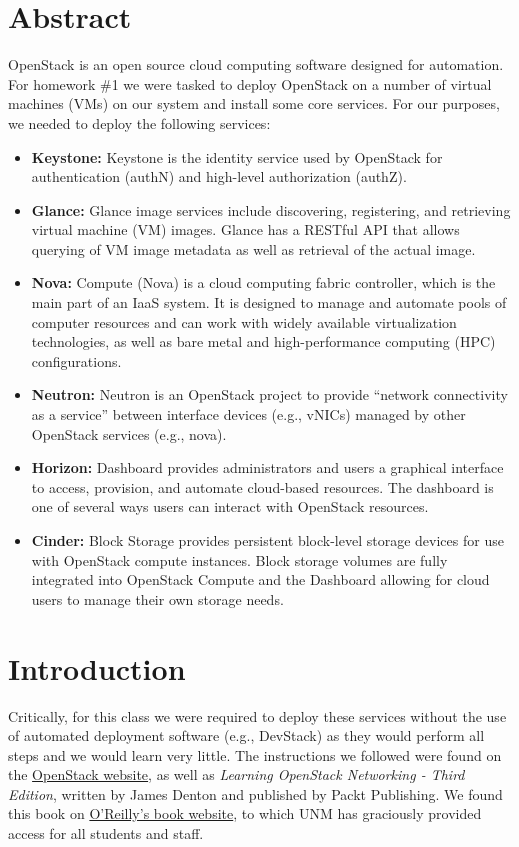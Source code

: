 \documentclass{article}
\begin{document}
\section{Abstract}
OpenStack is an open source cloud computing software designed for automation. For homework \#1 we were tasked to deploy OpenStack on a number of virtual machines (VMs) on our system and install some core services. For our purposes, we needed to deploy the following services:

\begin{itemize}
    \item \textbf{Keystone:} Keystone is the identity service used by OpenStack for authentication (authN) and high-level authorization (authZ).
    \item \textbf{Glance:} Glance image services include discovering, registering, and retrieving virtual machine (VM) images. Glance has a RESTful API that allows querying of VM image metadata as well as retrieval of the actual image.
    \item \textbf{Nova:} Compute (Nova) is a cloud computing fabric controller, which is the main part of an IaaS system. It is designed to manage and automate pools of computer resources and can work with widely available virtualization technologies, as well as bare metal and high-performance computing (HPC) configurations.
    \item \textbf{Neutron:} Neutron is an OpenStack project to provide “network connectivity as a service” between interface devices (e.g., vNICs) managed by other OpenStack services (e.g., nova).
    \item \textbf{Horizon:} Dashboard provides administrators and users a graphical interface to access, provision, and automate cloud-based resources. The dashboard is one of several ways users can interact with OpenStack resources.
    \item \textbf{Cinder:} Block Storage provides persistent block-level storage devices for use with OpenStack compute instances. Block storage volumes are fully integrated into OpenStack Compute and the Dashboard allowing for cloud users to manage their own storage needs.
\end{itemize}

\section{Introduction}
Critically, for this class we were required to deploy these services without the use of automated deployment software (e.g., DevStack) as they would perform all steps and we would learn very little. The instructions we followed were found on the \href{https://docs.openstack.org/train/install/}{OpenStack website}, as well as \textit{Learning OpenStack Networking - Third Edition}, written by James Denton and published by Packt Publishing. We found this book on \href{https://learning.oreilly.com/library/view/learning-openstack-networking/9781788392495/}{O'Reilly's book website}, to which UNM has graciously provided access for all students and staff.
\end{document}

